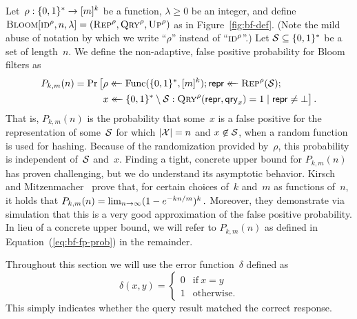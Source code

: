 Let~$\rho:\{0,1\}^*\to[m]^k$ be a function, $\lambda\geq0$ be an integer, and
define $\textnormal{\textsc{Bloom}}[\textnormal{\textsc{id}}^\rho,n,\lambda] = (\textnormal{\textsc{Rep}}^\rho, \textnormal{\textsc{Qry}}^\rho, \textnormal{\textsc{Up}}^\rho)$ as in
Figure~\ref{fig:bf-def}. (Note the mild abuse of notation by which we write
``$\rho$'' instead of ``$\textnormal{\textsc{id}}^\rho$''.)
%
Let $\mathcal{S}\subseteq\{0,1\}^*$ be a set of length~$n$. We define the non-adaptive, false positive
probability for Bloom filters as
\begin{equation}\label{eq:bf-fp-prob}
  \begin{aligned}
    P_{k,m}(n) =
      \Pr\big[&\rho \getsr \Func(\bits^*,[m]^k);
              \pub \getsr \Rep^\rho(\setS); \\
              &x \getsr \bits^*\setminus\setS: \Qry^\rho(\pub, \qry_x) = 1 \given \pub \ne \bot
      \big] \,.
  \end{aligned}
\end{equation}
%
%
That is, $P_{k,m}(n)$ is the probability that some~$x$ is a false positive for
the representation of some~$\mathcal{S}$ for which $|\mathcal{X}|=n$ and $x\not\in\mathcal{S}$,
when a random function is used for hashing. Because of the randomization
provided by~$\rho$, this probability is independent of~$\mathcal{S}$ and~$x$.
%
Finding a tight, concrete upper bound for $P_{k,m}(n)$ has proven challenging,
but we do understand its asymptotic behavior. Kirsch and
Mitzenmacher~\cite{kirsch2006less} prove that, for certain choices of~$k$
and~$m$ as functions of~$n$, it holds that
$
  P_{k,m}(n) = \lim_{n{\rightarrow}\infty} (1-e^{-kn/m})^k \,.
$
%
Moreover, they demonstrate via simulation that this is a very good approximation
of the false positive probability.
%
In lieu of a concrete upper bound, we will refer to $P_{k,m}(n)$ as defined in
Equation~(\ref{eq:bf-fp-prob}) in the remainder.

%
Throughout this section we will use the error function~$\delta$ defined as
\begin{equation}
  \delta(x, y) =
  \begin{cases}
    0 & \text{if}\ x=y \\
    1 & \text{otherwise.}
  \end{cases}
\end{equation}
This simply indicates whether the query result matched the correct response.

